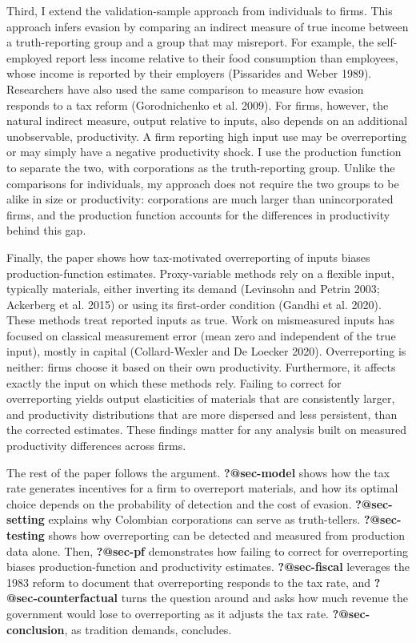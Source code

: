 \documentclass[
  12pt]{article}
\begin{document}
Third, I extend the validation-sample approach from individuals to
firms. This approach infers evasion by comparing an indirect measure of
true income between a truth-reporting group and a group that may
misreport. For example, the self-employed report less income relative to
their food consumption than employees, whose income is reported by their
employers (Pissarides and Weber 1989). Researchers have also used the
same comparison to measure how evasion responds to a tax reform
(Gorodnichenko et al. 2009). For firms, however, the natural indirect
measure, output relative to inputs, also depends on an additional
unobservable, productivity. A firm reporting high input use may be
overreporting or may simply have a negative productivity shock. I use
the production function to separate the two, with corporations as the
truth-reporting group. Unlike the comparisons for individuals, my
approach does not require the two groups to be alike in size or
productivity: corporations are much larger than unincorporated firms,
and the production function accounts for the differences in productivity
behind this gap.

Finally, {the paper} shows how tax-motivated overreporting of inputs
biases production-function estimates. Proxy-variable methods rely on a
flexible input, typically materials, either inverting its demand
(Levinsohn and Petrin 2003; Ackerberg et al. 2015) or using its
first-order condition (Gandhi et al. 2020). These methods treat reported
inputs as true. Work on mismeasured inputs has focused on classical
measurement error (mean zero and independent of the true input), mostly
in capital (Collard-Wexler and De Loecker 2020). Overreporting is
neither: firms choose it based on their own productivity. Furthermore,
it affects exactly the input on which these methods rely. Failing to
correct for overreporting yields output elasticities of materials that
are consistently larger, and productivity distributions that are more
dispersed and less persistent, than the corrected estimates. These
findings matter for any analysis built on measured productivity
differences across firms.

The rest of the paper follows the argument. \textbf{?@sec-model} shows
how the tax rate generates incentives for a firm to overreport
materials, and how its optimal choice depends on the probability of
detection and the cost of evasion. \textbf{?@sec-setting} explains why
Colombian corporations can serve as truth-tellers.
\textbf{?@sec-testing} shows how overreporting can be detected and
measured from production data alone. Then, \textbf{?@sec-pf}
demonstrates how failing to correct for overreporting biases
production-function and productivity estimates. \textbf{?@sec-fiscal}
leverages the 1983 reform to document that overreporting responds to the
tax rate, and \textbf{?@sec-counterfactual} turns the question around
and asks how much revenue the government would lose to overreporting as
it adjusts the tax rate. \textbf{?@sec-conclusion}, as tradition
demands, concludes.
\end{document}
